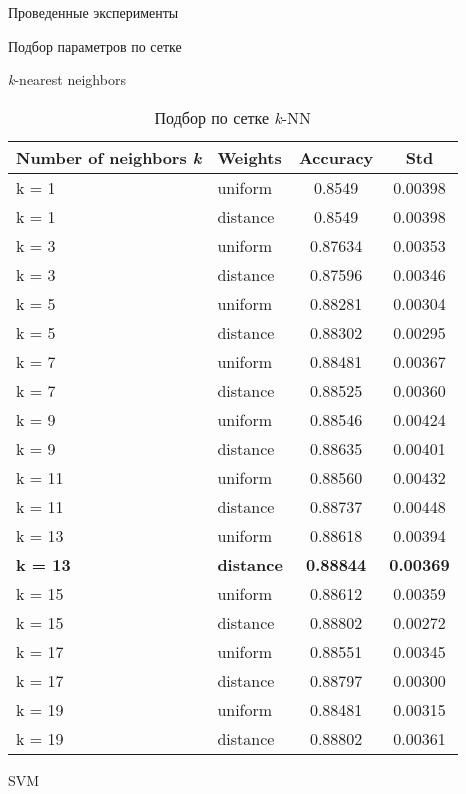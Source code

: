 \begin{section}{Проведенные эксперименты}
\begin{subsection}{Подбор параметров по сетке}
\begin{subsubsection}{\textit{k}-nearest neighbors}
  \begin{table}[H]
  \centering
  {\begin{tabular}{|l|l|c|c|}
  \hline
  \textbf{Number of neighbors \textit{k}} & \textbf{Weights} & \textbf{Accuracy} & \textbf{Std} \\
  \hline
  k = 1 & uniform  & 0.8549 & 0.00398 \\
  \hline
  k = 1 & distance  & 0.8549 & 0.00398 \\
  \hline
  k = 3 & uniform  & 0.87634 & 0.00353 \\
  \hline
  k = 3 &  distance & 0.87596  & 0.00346 \\
  \hline
  k = 5 & uniform  & 0.88281 & 0.00304 \\
  \hline
  k = 5 & distance  & 0.88302 & 0.00295 \\
  \hline
  k = 7 & uniform  & 0.88481 & 0.00367 \\
  \hline
  k = 7 &  distance & 0.88525  & 0.00360 \\
  \hline
  k = 9 & uniform  & 0.88546 & 0.00424 \\
  \hline
  k = 9 & distance  & 0.88635 & 0.00401 \\
  \hline
  k = 11 & uniform  & 0.88560 & 0.00432 \\
  \hline
  k = 11 &  distance & 0.88737  & 0.00448 \\
  \hline
  k = 13 & uniform  & 0.88618 &  0.00394 \\
  \hline
  \textbf{k = 13} & \textbf{distance}  & \textbf{0.88844} & \textbf{0.00369} \\
  \hline
  k = 15 & uniform  & 0.88612 & 0.00359 \\
  \hline
  k = 15 &  distance & 0.88802  & 0.00272 \\
  \hline
  k = 17 & uniform  & 0.88551 & 0.00345 \\
  \hline
  k = 17 & distance  & 0.88797 & 0.00300 \\
  \hline
  k = 19 & uniform  & 0.88481 & 0.00315 \\
  \hline
  k = 19 &  distance & 0.88802  & 0.00361 \\
  \hline
  \end{tabular}}

  \caption{Подбор по сетке \textit{k}-NN}
  \label{grid:knn}
  \end{table}



\end{subsubsection}

\begin{subsubsection}{SVM}


\end{subsubsection}
\end{subsection}
\end{section}
